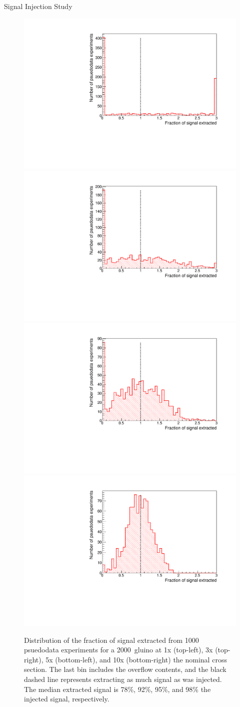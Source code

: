 \begin{subsection}{Signal Injection Study}
\begin{figure}[tbp!]
\centering
\includegraphics[angle=0,width=0.45\columnwidth]{fig/siginj_bias_1x.pdf}
\includegraphics[angle=0,width=0.45\columnwidth]{fig/siginj_bias_3x.pdf}
\includegraphics[angle=0,width=0.45\columnwidth]{fig/siginj_bias_5x.pdf}
\includegraphics[angle=0,width=0.45\columnwidth]{fig/siginj_bias_10x.pdf}
\caption{Distribution of the fraction of signal extracted from 1000 psuedodata experiments for a 2000~\GeV gluino at 1x (top-left), 3x (top-right), 5x (bottom-left), and 10x (bottom-right) the nominal cross section.
The last bin includes the overflow contents, and the black dashed line represents extracting as much signal as was injected.
The median extracted signal is 78\%, 92\%, 95\%, and 98\% the injected signal, respectively.}
\label{fig:siginj_bias_study}
\end{figure}


\end{subsection}
